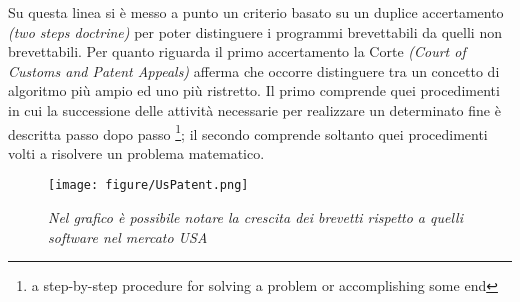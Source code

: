 Su questa linea si è messo a punto un criterio basato su un duplice accertamento \textit{(two steps doctrine)} per poter distinguere i programmi brevettabili da quelli non brevettabili. Per quanto riguarda il primo accertamento la Corte \textit{(Court of Customs and Patent Appeals)} afferma che occorre distinguere tra un concetto di algoritmo più ampio ed uno più ristretto. Il primo comprende quei procedimenti in cui la successione delle attività necessarie per realizzare un determinato fine è descritta passo dopo passo \footnote{a step-by-step procedure for solving a problem or accomplishing some end}; il secondo comprende soltanto quei procedimenti volti a risolvere un problema matematico.




\begin{figure}[bh]
	\begin{center}
		\texttt{[image: figure/UsPatent.png]}
	\end{center}
	\caption[\textit{Grafico dei brevetti software per anno in USA}]{\textit{Nel grafico è possibile notare la crescita dei brevetti rispetto a quelli software nel mercato USA}}
\end{figure}

